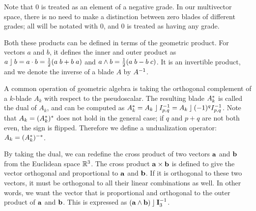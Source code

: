 
Note that $0$ is treated as an element of a negative grade.  In our multivector space, there is no need to make a distinction between zero blades of different grades; all will be notated with $0$, and $0$ is treated as having any grade.

Both these products can be defined in terms of the geometric product.  For vectors $a$ and $b$, it defines the inner and outer product as $a \mathbin{\rfloor} b = a \mathbin{\cdot} b = \frac{1}{2} (a \; b + b \; a)$ and $a \wedge b = \frac{1}{2} (a \; b - b \; c)$.  It is an invertible product, and we denote the inverse of a blade $A$ by $A^{-1}$.

A common operation of geometric algebra is taking the orthogonal complement of a $k$-blade $A_k$ with respect to the pseudoscalar.  The resulting blade $A_k^\ast$ is called the dual of $A_k$, and can be computed as $A_k^\ast = A_k \mathbin{\rfloor} I_{p,q}^{-1} = A_k \mathbin{\rfloor} (-1)^qI^{-1}_{p,q}$.  Note that $A_k = (A_k^\ast)^\ast$ does not hold in the general case; if $q$ and $p+q$ are not both even, the sign is flipped.  Therefore we define a undualization operator: $A_k = (A_k^\ast)^{-\ast}$.

By taking the dual, we can redefine the cross product of two vectors $\mathbf{a}$ and $\mathbf{b}$ from the Euclidean space $\mathbb{R}^3$.  The cross product $\mathbf{a} \times \mathbf{b}$ is defined to give the vector orthogonal and proportional to $\mathbf{a}$ and $\mathbf{b}$.  If it is orthogonal to these two vectors, it must be orthogonal to all their linear combinations as well.  In other words, we want the vector that is proportional and orthogonal to the outer product of $\mathbf{a}$ and $\mathbf{b}$.  This is expressed as $(\mathbf{a} \wedge \mathbf{b}) \mathbin{\rfloor} \mathbf{I}_3^{-1}$. 


